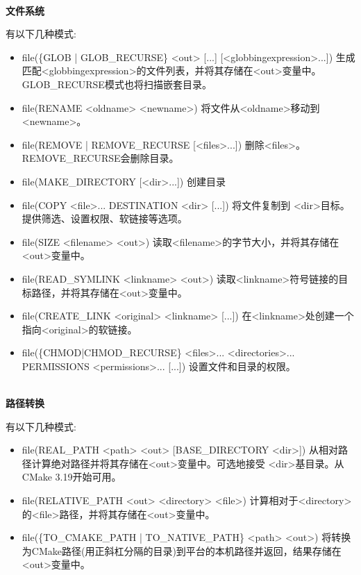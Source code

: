 \hspace*{\fill} \\ %
\noindent
\textbf{文件系统}

有以下几种模式:

\begin{itemize}
\item 
file(\{GLOB | GLOB\_RECURSE\} <out> [...] [<globbingexpression>...]) 生成匹配<globbingexpression>的文件列表，并将其存储在<out>变量中。GLOB\_RECURSE模式也将扫描嵌套目录。

\item 
file(RENAME <oldname> <newname>) 将文件从<oldname>移动到<newname>。

\item 
file({REMOVE | REMOVE\_RECURSE } [<files>...]) 删除<files>。REMOVE\_RECURSE会删除目录。

\item 
file(MAKE\_DIRECTORY [<dir>...]) 创建目录

\item 
file(COPY <file>... DESTINATION <dir> [...]) 将文件复制到
<dir>目标。提供筛选、设置权限、软链接等选项。

\item 
file(SIZE <filename> <out>) 读取<filename>的字节大小，并将其存储在<out>变量中。

\item 
file(READ\_SYMLINK <linkname> <out>) 读取<linkname>符号链接的目标路径，并将其存储在<out>变量中。

\item
file(CREATE\_LINK <original> <linkname> [...]) 在<linkname>处创建一个指向<original>的软链接。

\item 
file(\{CHMOD|CHMOD\_RECURSE\} <files>... <directories>... PERMISSIONS <permissions>... [...]) 设置文件和目录的权限。
\end{itemize}

\hspace*{\fill} \\ %
\noindent
\textbf{路径转换}

有以下几种模式:

\begin{itemize}
\item 
file(REAL\_PATH <path> <out> [BASE\_DIRECTORY <dir>]) 从相对路径计算绝对路径并将其存储在<out>变量中。可选地接受
<dir>基目录。从CMake 3.19开始可用。

\item 
file(RELATIVE\_PATH <out> <directory> <file>) 计算相对于<directory>的<file>路径，并将其存储在<out>变量中。

\item 
file(\{TO\_CMAKE\_PATH | TO\_NATIVE\_PATH\} <path> <out>) 将转换为CMake路径(用正斜杠分隔的目录)到平台的本机路径并返回，结果存储在<out>变量中。
\end{itemize}

